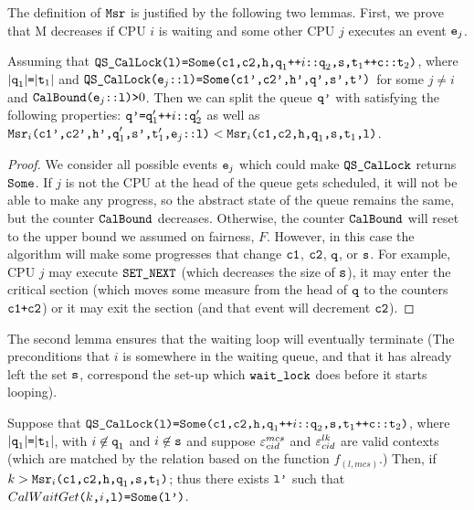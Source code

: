 The definition of ${\mathrm{\texttt{Msr}}}$ is justified by the following two
lemmas. First, we prove that M decreases if CPU $i$ is waiting and some other CPU
$j$ executes an event ${\mathrm{\texttt{e}}}_{j}$.

\begin{lemma}
\label{lem:chapter:mcslock:MCS_CalLock_progress_onestep}
Assuming that ${\mathrm{\texttt{QS\_CalLock}}}{\mathrm{\texttt{(l)=}}}{\mathrm{\texttt{Some}}}{\mathrm{\texttt{(c1,c2,h,q}}}_1{\mathrm{\texttt{++}}}i{\mathrm{\texttt{::q}}}_2{\mathrm{\texttt{,s,t}}}_1{\mathrm{\texttt{++c::t}}}_2{\mathrm{\texttt{)}}}$, where
$|{\mathrm{\texttt{q}}}_1|{\mathrm{\texttt{=}}}|{\mathrm{\texttt{t}}}_1|$ and ${\mathrm{\texttt{QS\_CalLock}}}{\mathrm{\texttt{(e}}}_j{\mathrm{\texttt{::l)=}}}{\mathrm{\texttt{Some}}}{\mathrm{\texttt{(c1',c2',h',q',s',t')}}} $
for some $j\neq i$ and 
 ${\mathrm{\texttt{CalBound}}}{\mathrm{\texttt{(e}}}_j{\mathrm{\texttt{::l)}}}{\mathrm{\texttt{>}}}0$.
Then we can split the queue ${\mathrm{\texttt{q'}}}$ with satisfying the following properties:
${\mathrm{\texttt{q'=q}}}_{1}'{\mathrm{\texttt{++}}}i{\mathrm{\texttt{::q}}}_{2}'$ as well as
${\mathrm{\texttt{Msr}}}_i{\mathrm{\texttt{(c1',c2',h',q}}}_{1}'{\mathrm{\texttt{,s',t}}}_{1}'{\mathrm{\texttt{,e}}}_j{\mathrm{\texttt{::l)}}}<{\mathrm{\texttt{Msr}}}_i{\mathrm{\texttt{(c1,c2,h,q}}}_1{\mathrm{\texttt{,s,t}}}_1{\mathrm{\texttt{,l)}}}$.
\end{lemma}

\begin{proof}
 We consider all possible events
${\mathrm{\texttt{e}}}_j$ which could make ${\mathrm{\texttt{QS\_CalLock}}}$ returns ${\mathrm{\texttt{Some}}}$. If $j$ is not the 
CPU at the head of the queue gets scheduled, it will not be
able to make any progress, so the abstract state of the queue remains the same,
but the counter ${\mathrm{\texttt{CalBound}}}$ decreases.
Otherwise, the counter ${\mathrm{\texttt{CalBound}}}$ will reset to the upper bound we assumed on fairness, $F$. 
However, in this case the algorithm will make some progresses that change ${\mathrm{\texttt{c1}}}$, ${\mathrm{\texttt{c2}}}$, ${\mathrm{\texttt{q}}}$, or ${\mathrm{\texttt{s}}}$.
For example,  CPU $j$ may execute  ${\mathrm{\texttt{SET\_NEXT}}}$ (which decreases the size of
${\mathrm{\texttt{s}}}$), it may enter the critical section (which moves some measure from
the head of ${\mathrm{\texttt{q}}}$ to the counters ${\mathrm{\texttt{c1+c2}}}$) or it may exit the section
(and that event will decrement ${\mathrm{\texttt{c2}}}$).
\end{proof}


The second lemma ensures that the waiting loop will eventually
terminate (The preconditions that $i$ is somewhere in the waiting queue,
and that it has already left the set ${\mathrm{\texttt{s}}}$, correspond the set-up
which ${\mathrm{\texttt{wait\_lock}}}$ does before it starts looping).

\begin{lemma}
\label{lem:chapter:mcslock:CalWaitGet_exist'}
Suppose that ${\mathrm{\texttt{QS\_CalLock}}}{\mathrm{\texttt{(l)=}}}{\mathrm{\texttt{Some}}}{\mathrm{\texttt{(c1,c2,h,q}}}_1{\mathrm{\texttt{++}}}i{\mathrm{\texttt{::q}}}_2{\mathrm{\texttt{,s,t}}}_1{\mathrm{\texttt{++c::t}}}_2{\mathrm{\texttt{)}}}$, where
$|{\mathrm{\texttt{q}}}_1|{\mathrm{\texttt{=}}}|{\mathrm{\texttt{t}}}_1|$, with $i \not\in{\mathrm{\texttt{q}}}_1$ and $i \not\in{\mathrm{\texttt{s}}}$ and suppose ${\varepsilon}^{mcs}_{cid}$ and ${\varepsilon}^{lk}_{cid}$  are valid
contexts (which are matched by the relation based on the function $f_{(l, mcs)}$.) Then, if $k>{\mathrm{\texttt{Msr}}}_i{\mathrm{\texttt{(c1,c2,h,q}}}_1{\mathrm{\texttt{,s,t}}}_1{\mathrm{\texttt{)}}}$; thus there exists ${\mathrm{\texttt{l'}}}$ such
that $CalWaitGet{\mathrm{\texttt{(}}}k{\mathrm{\texttt{,}}}i{\mathrm{\texttt{,l)=}}}{\mathrm{\texttt{Some}}}{\mathrm{\texttt{(l')}}}$.
\end{lemma}


